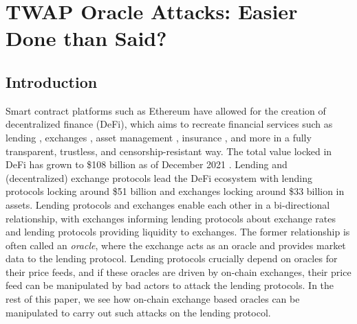 \chapter{TWAP Oracle Attacks: Easier Done than Said?}  %
\label{chapter:oracles}

\section{Introduction}
Smart contract platforms such as Ethereum \cite{wood2014ethereum} have allowed for the creation of decentralized finance (DeFi), which aims to recreate financial services such as lending \cite{leshner2019compound,AaveWhitepaper}, exchanges \cite{Zhang2018UniV1,warren20170x}, asset management \cite{yearn_finance,convex_finance}, insurance \cite{KarpNexusMutual}, and more in a fully transparent, trustless, and censorship-resistant way. The total value locked in DeFi has grown to \$108 billion as of December 2021 \cite{DeFiPulse}. Lending and (decentralized) exchange protocols lead the DeFi ecosystem with lending protocols locking around \$51 billion and exchanges locking around \$33 billion in assets. Lending protocols and exchanges enable each other in a bi-directional relationship, with exchanges informing lending protocols about exchange rates and lending protocols providing liquidity to exchanges. The former relationship is often called an \textit{oracle}, where the exchange acts as an oracle and provides market data to the lending protocol. Lending protocols crucially depend on oracles for their price feeds, and if these oracles are driven by on-chain exchanges, their price feed can be manipulated by bad actors to attack the lending protocols. In the rest of this paper, we see how on-chain exchange based oracles can be manipulated to carry out such attacks on the lending protocol.

